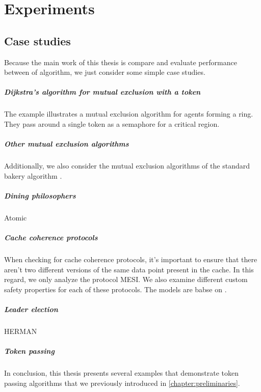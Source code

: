 \chapter{Experiments}\label{chapter:experiment}

\section{Case studies}
Because the main work of this thesis is compare and evaluate performance between 
of algorithm, we just consider some simple case studies.
\paragraph{Dijkstra’s algorithm for mutual exclusion with a token}
The example illustrates a mutual exclusion algorithm \cite*{fribourg1997reachability} for agents forming a ring. 
They pass around a single token as a semaphore for a critical region.
\paragraph{Other mutual exclusion algorithms}
Additionally, we also consider the mutual exclusion algorithms of the standard bakery algorithm \cite*{chen2017learning}.
\paragraph{Dining philosophers}
Atomic
\paragraph{Cache coherence protocols}
When checking for cache coherence protocols, it's important to ensure that there aren't two different versions of the same data point present in the cache. 
In this regard, we only analyze the protocol MESI. 
We also examine different custom safety properties for each of these protocols.
The models are babse on \cite*{delzanno2000automatic}.
\paragraph{Leader election}
HERMAN
\paragraph{Token passing}
In conclusion, this thesis presents several examples that demonstrate token passing algorithms that we previously introduced 
in \autoref{chapter:preliminaries}.


